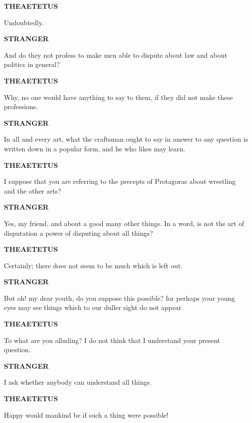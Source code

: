 \documentclass[11pt,letter]{article}
\begin{document}
\par \textbf{THEAETETUS}
\par   Undoubtedly.

\par \textbf{STRANGER}
\par   And do they not profess to make men able to dispute about law and about politics in general?

\par \textbf{THEAETETUS}
\par   Why, no one would have anything to say to them, if they did not make these professions.

\par \textbf{STRANGER}
\par   In all and every art, what the craftsman ought to say in answer to any question is written down in a popular form, and he who likes may learn.

\par \textbf{THEAETETUS}
\par   I suppose that you are referring to the precepts of Protagoras about wrestling and the other arts?

\par \textbf{STRANGER}
\par   Yes, my friend, and about a good many other things. In a word, is not the art of disputation a power of disputing about all things?

\par \textbf{THEAETETUS}
\par   Certainly; there does not seem to be much which is left out.

\par \textbf{STRANGER}
\par   But oh! my dear youth, do you suppose this possible? for perhaps your young eyes may see things which to our duller sight do not appear.

\par \textbf{THEAETETUS}
\par   To what are you alluding? I do not think that I understand your present question.

\par \textbf{STRANGER}
\par   I ask whether anybody can understand all things.

\par \textbf{THEAETETUS}
\par   Happy would mankind be if such a thing were possible!
\end{document}
